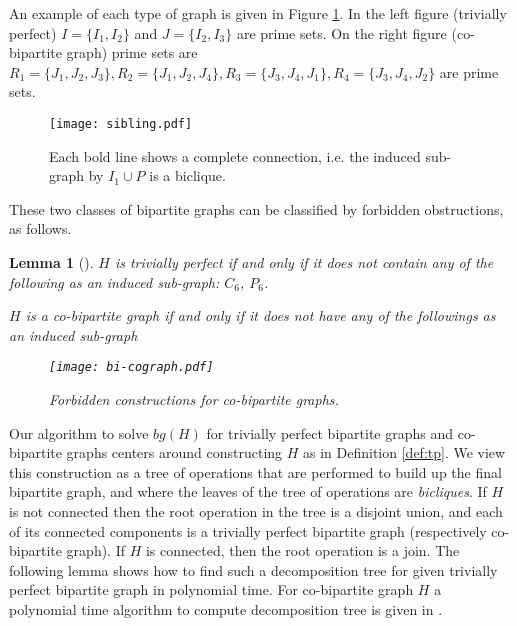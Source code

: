 \documentclass[letterpaper,11pt,abstracton]{scrartcl}
\newtheorem{lemma}[theorem]{Lemma}
\begin{document}
An example of each type of graph is given in Figure \ref{fig:sibling}. In the left figure (trivially perfect) $I=\{I_1,I_2\}$ and $J=\{I_2,I_3\}$ are prime sets.
On the right figure (co-bipartite graph) prime sets are $R_1=\{J_1,J_2,J_3\}, R_2=\{J_1,J_2,J_4\},R_3=\{J_3,J_4,J_1\},R_4=\{J_3,J_4,J_2\}$ are prime
sets.

\begin{figure}[htbp]
 \begin{center}
\texttt{[image: sibling.pdf]}
\caption{
Each bold line shows a complete connection, i.e. the induced sub-graph
by $I_1 \cup P$ is a biclique.
}
    \label{fig:sibling}
  \end{center}
 \end{figure}
These two classes of bipartite graphs can be classified by forbidden obstructions, as follows.

\begin{lemma}[\cite{EKLT12,GV97}] \label{lm:obstruct}
  $H$ is trivially perfect if and only if it does not contain any of the
  following as an induced sub-graph: $C_6$, $P_6$.

  $H$ is a co-bipartite graph if and only if it does not have any of the
  followings as an induced sub-graph 

\begin{figure}[htbp]
 \begin{center}
\texttt{[image: bi-cograph.pdf]}
\caption{
\footnotesize{Forbidden constructions for co-bipartite graphs.
 }
}
  \end{center}
 \end{figure}
\end{lemma}
Our algorithm to solve $bg(H)$ for trivially perfect bipartite graphs and co-bipartite graphs
centers around constructing $H$ as in Definition \ref{def:tp}.  We view this
construction as a tree of operations that are performed to build up the final
bipartite graph, and where the leaves of the tree of operations are \emph{bicliques}.
If $H$ is not connected then the root operation in the tree is a disjoint
union, and each of its connected components is a trivially perfect
bipartite graph (respectively co-bipartite graph).  If $H$ is connected, then the root operation is a
join. The following lemma shows how to find such a decomposition tree for given trivially perfect bipartite graph in polynomial time. For co-bipartite graph $H$ a polynomial time algorithm to compute decomposition tree is given in \cite{GV97}.
\end{document}
